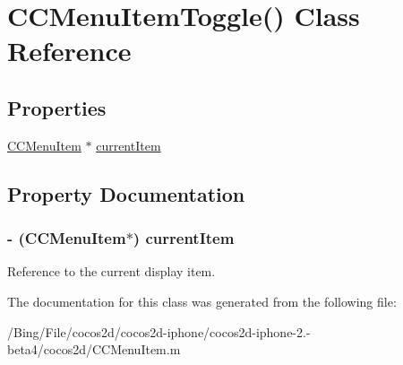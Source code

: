 \hypertarget{interface_c_c_menu_item_toggle_07_08}{\section{C\-C\-Menu\-Item\-Toggle() Class Reference}
\label{interface_c_c_menu_item_toggle_07_08}
}
\subsection*{Properties}
\begin{DoxyCompactItemize}
\item 
\hyperlink{interface_c_c_menu_item}{C\-C\-Menu\-Item} $\ast$ \hyperlink{interface_c_c_menu_item_toggle_07_08_ab4284175a5a6119d033cd1962bda2924}{current\-Item}
\end{DoxyCompactItemize}


\subsection{Property Documentation}
\hypertarget{interface_c_c_menu_item_toggle_07_08_ab4284175a5a6119d033cd1962bda2924}{
\subsubsection[{current\-Item}]{\setlength{\rightskip}{0pt plus 5cm}-\/ ({\bf C\-C\-Menu\-Item}$\ast$) {\bf current\-Item}}}\label{interface_c_c_menu_item_toggle_07_08_ab4284175a5a6119d033cd1962bda2924}
Reference to the current display item. 

The documentation for this class was generated from the following file\-:\begin{DoxyCompactItemize}
\item 
/\-Bing/\-File/cocos2d/cocos2d-\/iphone/cocos2d-\/iphone-\/2.-\/beta4/cocos2d/C\-C\-Menu\-Item.\-m\end{DoxyCompactItemize}
